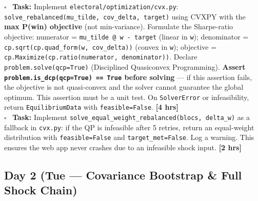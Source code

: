 \documentclass[11pt]{article}
\newcommand{\hrs}[1]{\textbf{[#1 hrs]}}
\newcommand{\dayhead}[2]{%
  \subsection*{Day #1 \normalfont\small\color{codegray}(#2)}}
\newcommand{\task}[2]{%
  \noindent\textbf{Task:} #1 \hfill \hrs{#2}\\}
\newcommand{\done}{\textcolor{sectionblue}{$\square$}\ }
\begin{document}
\begin{taskbox}
\done \task{Implement \texttt{electoral/optimization/cvx.py}:
  \texttt{solve\_rebalanced(mu\_tilde, cov\_delta, target)} using CVXPY with
  the \textbf{max P(win) objective} (not min-variance).
  Formulate the Sharpe-ratio objective:
  numerator = \texttt{mu\_tilde @ w - target} (linear in \texttt{w});
  denominator = \texttt{cp.sqrt(cp.quad\_form(w, cov\_delta))} (convex in \texttt{w});
  objective = \texttt{cp.Maximize(cp.ratio(numerator, denominator))}.
  Declare \texttt{problem.solve(qcp=True)} (Disciplined Quasiconvex Programming).
  \textbf{Assert \texttt{problem.is\_dcp(qcp=True) == True} before solving} ---
  if this assertion fails, the objective is not quasi-convex and the solver
  cannot guarantee the global optimum. This assertion must be a unit test.
  On \texttt{SolverError} or infeasibility, return \texttt{EquilibriumData}
  with \texttt{feasible=False}.}{4}

\done \task{Implement \texttt{solve\_equal\_weight\_rebalanced(blocs, delta\_w)}
  as a fallback in \texttt{cvx.py}: if the QP is infeasible after 5 retries,
  return an equal-weight distribution with \texttt{feasible=False} and
  \texttt{target\_met=False}. Log a warning. This ensures the web app
  never crashes due to an infeasible shock input.}{2}
\end{taskbox}

\dayhead{2}{Tue --- Covariance Bootstrap \& Full Shock Chain}
\end{document}
